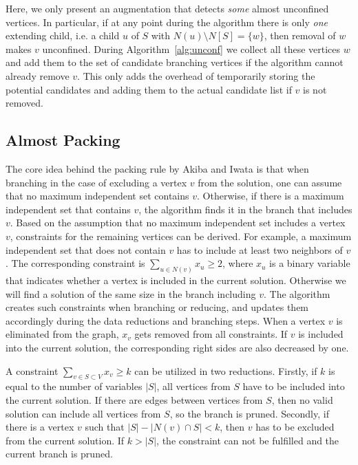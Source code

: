 \documentclass[a4paper,UKenglish,cleveref, autoref, thm-restate]{lipics-v2021}
\begin{document}
Here, we only present an augmentation that detects \emph{some} almost
unconfined vertices. In particular, if at any point during the algorithm there
is only \emph{one} extending child, i.e. a child $u$ of $S$ with $N(u)\setminus
N[S] = \{w\}$, then removal of $w$ makes $v$ unconfined. During
Algorithm~\ref{alg:unconf} we collect all these vertices $w$ and add them to the
set of candidate branching vertices if the algorithm cannot already remove $v$.
This only adds the overhead of temporarily storing the potential candidates and
adding them to the actual candidate list if $v$ is not removed.


\subsection{Almost Packing}\label{sec:almost_packing}

The core idea behind the packing rule by Akiba and Iwata \cite{AkibaIwata} is
that when branching in the case of excluding a vertex $v$ from the solution, one
can assume that no maximum independent set contains $v$. Otherwise, if there is
a maximum independent set that contains $v$, the algorithm finds it in the
branch that includes $v$. Based on the assumption that no maximum independent
set includes a vertex $v$, constraints for the remaining vertices can be
derived. For example, a maximum independent set that does not contain $v$ has to
include at least two neighbors of $v$. The corresponding constraint is
$\sum_{u\in N(v)}x_u \geq2$, where $x_u$ is a binary variable that indicates
whether a vertex is included in the current solution. Otherwise we will find a
solution of the same size in the branch including $v$. The algorithm creates such
constraints when branching or reducing, and updates them accordingly during the data reductions and branching steps. When a vertex $v$ is eliminated from the graph, $x_v$ gets removed from all constraints. If $v$ is included into the current solution, the corresponding right sides are also decreased by one.

A constraint $\sum_{v\in S\subset V}x_v\geq k$ can be utilized in two
reductions. Firstly, if $k$ is equal to the number of variables $|S|$, all
vertices from $S$ have to be included into the current solution. If there are
edges between vertices from $S$, then no valid solution can include all vertices
from $S$, so the branch is pruned. Secondly, if there is a vertex $v$ such that $|S|-|N(v)\cap S| < k$, then $v$ has to be excluded from the current solution. If $k > |S|$, the constraint can not be fulfilled and the current branch is pruned.
\end{document}
